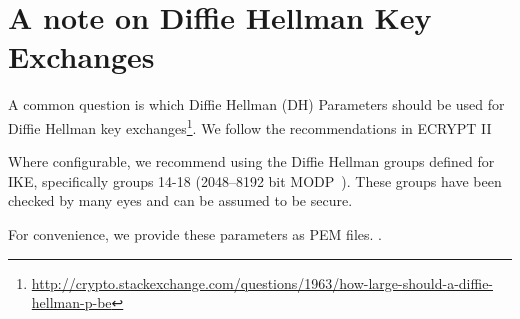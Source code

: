 \section{A note on Diffie Hellman Key Exchanges}
\label{section:DH}

A common question is which Diffie Hellman (DH) Parameters  should be used for
Diffie Hellman key
exchanges\footnote{\url{http://crypto.stackexchange.com/questions/1963/how-large-should-a-diffie-hellman-p-be}}.
We follow the recommendations in ECRYPT II~\cite[chapter 16]{ii2011ecrypt}

Where configurable, we recommend using the Diffie Hellman groups
defined for IKE, specifically groups 14-18 (2048--8192 bit MODP~\cite{rfc3526}).
These groups have been checked by many eyes and can be assumed to be secure.

For convenience, we provide these parameters as PEM files. .
